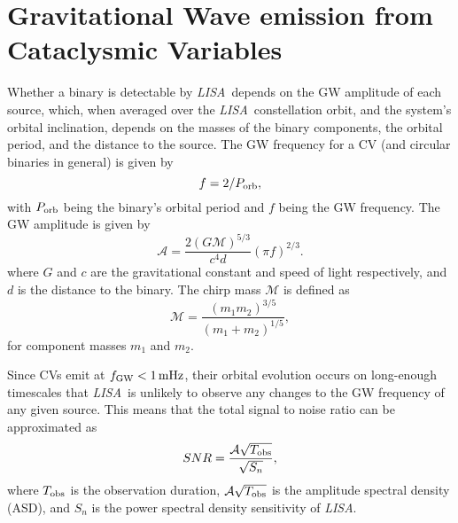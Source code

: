 \documentclass[fleqn,usenatbib]{mnras}
\newcommand{\lisa}{{\it LISA}}
\begin{document}

\section{Gravitational Wave emission from Cataclysmic Variables} \label{sec:gwemission}

Whether a binary is detectable by \lisa\ depends on the GW amplitude of each source, which, when averaged over the \lisa\ constellation orbit, and the system's orbital inclination, depends on the masses of the binary components, the orbital period, and the distance to the source. The GW frequency for a CV (and circular binaries in general) is given by
\begin{equation}
    f = 2/P_{\rm orb},
\end{equation}
with $P_{\rm orb}$ being the binary's orbital period and $f$ being the GW frequency. The GW amplitude is given by
\begin{equation}\label{eqn:amp}
    \mathcal{A} = \frac{2 (G \mathcal{M})^{5/3} }{c^4 d} (\pi f)^{2/3}.
\end{equation}
where $G$ and $c$ are the gravitational constant and speed of light respectively, and $d$ is the distance to the binary. The chirp mass $\mathcal{M}$ is defined as
\begin{equation}\label{eqn:mchirp}
    \mathcal{M} = \frac{(m_1 m_2)^{3/5}}{(m_1 + m_2)^{1/5}}, 
\end{equation}
for component masses $m_1$ and $m_2$.

Since CVs emit at $f_{\rm{GW}} < 1\,\rm{mHz}$, their orbital evolution occurs on long-enough timescales that \lisa\ is unlikely to observe any changes to the GW frequency of any given source. This means that the total signal to noise ratio can be approximated as
\begin{equation}\label{eq:SNR}
       SNR = \frac{\mathcal{A}\sqrt{T_{\rm{obs}}}}{\sqrt{S_n}},
\end{equation}
\noindent where $T_{\rm{obs}}$ is the observation duration, $\mathcal{A}\sqrt{T_{\rm{obs}}}$ is the amplitude spectral density (ASD), and $S_n$ is the power spectral density sensitivity of \lisa. 
\end{document}
